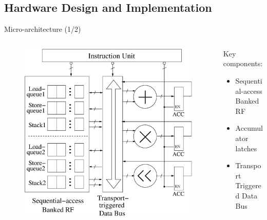 \documentclass{beamer}
\begin{document}
\begin{CJK}{UTF8}{bkai}
    \subsection{Hardware Design and Implementation}
    \begin{frame}{Micro-architecture (1/2)}
        \begin{columns}
            \begin{column}{0.6\textwidth}
                \begin{figure}[!ht] 
                    \centering
                    \includegraphics[width=1.0\textwidth]{./figs/micro.eps}
                \end{figure}
            \end{column}
            \begin{column}{0.4\textwidth}
                Key components:
                \begin{itemize}
                    \item Sequential-access Banked RF
                    \item Accumulator latches
                    \item Transport Triggered Data Bus
                \end{itemize}    
            \end{column}
        \end{columns}
    \end{frame}


\end{CJK}
\end{document}
